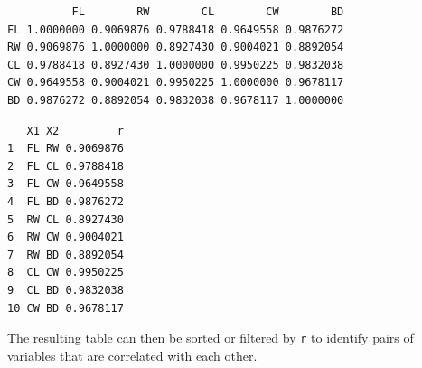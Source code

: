 \documentclass[
  13,
  letterpaper,
]{report}
\newenvironment{Shaded}{\begin{snugshade}}{\end{snugshade}}
\newcommand{\CommentTok}[1]{\textcolor[rgb]{0.37,0.37,0.37}{#1}}
\newcommand{\ConstantTok}[1]{\textcolor[rgb]{0.56,0.35,0.01}{#1}}
\newcommand{\ControlFlowTok}[1]{\textcolor[rgb]{0.00,0.23,0.31}{\textbf{#1}}}
\newcommand{\DecValTok}[1]{\textcolor[rgb]{0.68,0.00,0.00}{#1}}
\newcommand{\FloatTok}[1]{\textcolor[rgb]{0.68,0.00,0.00}{#1}}
\newcommand{\FunctionTok}[1]{\textcolor[rgb]{0.28,0.35,0.67}{#1}}
\newcommand{\NormalTok}[1]{\textcolor[rgb]{0.00,0.23,0.31}{#1}}
\newcommand{\OtherTok}[1]{\textcolor[rgb]{0.00,0.23,0.31}{#1}}
\newcommand{\SpecialCharTok}[1]{\textcolor[rgb]{0.37,0.37,0.37}{#1}}
\begin{document}
\begin{verbatim}
          FL        RW        CL        CW        BD
FL 1.0000000 0.9069876 0.9788418 0.9649558 0.9876272
RW 0.9069876 1.0000000 0.8927430 0.9004021 0.8892054
CL 0.9788418 0.8927430 1.0000000 0.9950225 0.9832038
CW 0.9649558 0.9004021 0.9950225 1.0000000 0.9678117
BD 0.9876272 0.8892054 0.9832038 0.9678117 1.0000000
\end{verbatim}

\begin{Shaded}
\end{Shaded}

\begin{verbatim}
   X1 X2         r
1  FL RW 0.9069876
2  FL CL 0.9788418
3  FL CW 0.9649558
4  FL BD 0.9876272
5  RW CL 0.8927430
6  RW CW 0.9004021
7  RW BD 0.8892054
8  CL CW 0.9950225
9  CL BD 0.9832038
10 CW BD 0.9678117
\end{verbatim}

The resulting table can then be sorted or filtered by \texttt{r} to
identify pairs of variables that are correlated with each other.

\begin{Shaded}
\end{Shaded}
\end{document}
